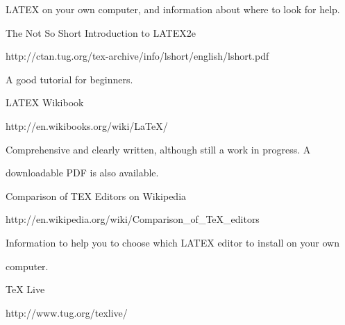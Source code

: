 \documentclass[a4paper,portrait,12pt]{article}
\begin{document}
\begin{flushleft}
LATEX on your own computer, and information about where to look for help.
\end{flushleft}


\begin{flushleft}
The Not So Short Introduction to LATEX2e
\end{flushleft}


\begin{flushleft}
http://ctan.tug.org/tex-archive/info/lshort/english/lshort.pdf
\end{flushleft}


\begin{flushleft}
A good tutorial for beginners.
\end{flushleft}


\begin{flushleft}
LATEX Wikibook
\end{flushleft}


\begin{flushleft}
http://en.wikibooks.org/wiki/LaTeX/
\end{flushleft}


\begin{flushleft}
Comprehensive and clearly written, although still a work in progress. A
\end{flushleft}


\begin{flushleft}
downloadable PDF is also available.
\end{flushleft}


\begin{flushleft}
Comparison of TEX Editors on Wikipedia
\end{flushleft}


\begin{flushleft}
http://en.wikipedia.org/wiki/Comparison\_of\_TeX\_editors
\end{flushleft}


\begin{flushleft}
Information to help you to choose which LATEX editor to install on your own
\end{flushleft}


\begin{flushleft}
computer.
\end{flushleft}


\begin{flushleft}
TeX Live
\end{flushleft}


\begin{flushleft}
http://www.tug.org/texlive/
\end{flushleft}
\end{document}
